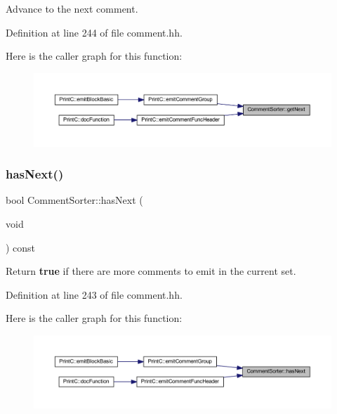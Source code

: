 Advance to the next comment. 



Definition at line 244 of file comment.\+hh.

Here is the caller graph for this function\+:
\nopagebreak
\begin{figure}[H]
\begin{center}
\leavevmode
\includegraphics[width=350pt]{class_comment_sorter_ad9ce1258fc843f1ddf0db5383073401a_icgraph}
\end{center}
\end{figure}
\mbox{\label{class_comment_sorter_ab34833183c89acdcf7a132d13705dba9}} 
\subsubsection{\texorpdfstring{hasNext()}{hasNext()}}
{\footnotesize\ttfamily bool Comment\+Sorter\+::has\+Next (\begin{DoxyParamCaption}\item[{void}]{ }\end{DoxyParamCaption}) const\hspace{0.3cm}{\ttfamily [inline]}}



Return {\bfseries{true}} if there are more comments to emit in the current set. 



Definition at line 243 of file comment.\+hh.

Here is the caller graph for this function\+:
\nopagebreak
\begin{figure}[H]
\begin{center}
\leavevmode
\includegraphics[width=350pt]{class_comment_sorter_ab34833183c89acdcf7a132d13705dba9_icgraph}
\end{center}
\end{figure}
\mbox{\label{class_comment_sorter_ac16fb35aebd4c38915061a3d68313d9e}} 
